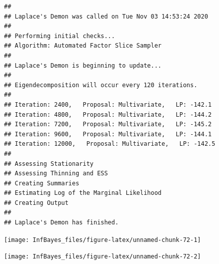 \documentclass[
]{book}
\newenvironment{Shaded}{\begin{snugshade}}{\end{snugshade}}
\newcommand{\AttributeTok}[1]{\textcolor[rgb]{0.77,0.63,0.00}{#1}}
\newcommand{\ConstantTok}[1]{\textcolor[rgb]{0.00,0.00,0.00}{#1}}
\newcommand{\DecValTok}[1]{\textcolor[rgb]{0.00,0.00,0.81}{#1}}
\newcommand{\FunctionTok}[1]{\textcolor[rgb]{0.00,0.00,0.00}{#1}}
\newcommand{\NormalTok}[1]{#1}
\newcommand{\OtherTok}[1]{\textcolor[rgb]{0.56,0.35,0.01}{#1}}
\newcommand{\SpecialCharTok}[1]{\textcolor[rgb]{0.00,0.00,0.00}{#1}}
\newcommand{\StringTok}[1]{\textcolor[rgb]{0.31,0.60,0.02}{#1}}
\begin{document}
\begin{verbatim}
## 
## Laplace's Demon was called on Tue Nov 03 14:53:24 2020
## 
## Performing initial checks...
## Algorithm: Automated Factor Slice Sampler 
## 
## Laplace's Demon is beginning to update...
## 
## Eigendecomposition will occur every 120 iterations.
## 
## Iteration: 2400,   Proposal: Multivariate,   LP: -142.1
## Iteration: 4800,   Proposal: Multivariate,   LP: -144.2
## Iteration: 7200,   Proposal: Multivariate,   LP: -145.2
## Iteration: 9600,   Proposal: Multivariate,   LP: -144.1
## Iteration: 12000,   Proposal: Multivariate,   LP: -142.5
## 
## Assessing Stationarity
## Assessing Thinning and ESS
## Creating Summaries
## Estimating Log of the Marginal Likelihood
## Creating Output
## 
## Laplace's Demon has finished.
\end{verbatim}

\begin{Shaded}
\end{Shaded}

\begin{center}\texttt{[image: InfBayes\_files/figure-latex/unnamed-chunk-72-1]} \end{center}

\begin{center}\texttt{[image: InfBayes\_files/figure-latex/unnamed-chunk-72-2]} \end{center}
\end{document}
